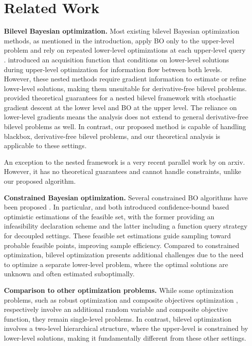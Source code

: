 \section{Related Work}
\textbf{Bilevel Bayesian optimization.} Most existing bilevel Bayesian optimization methods, as mentioned in the introduction, apply BO only to the upper-level problem and rely on repeated lower-level optimizations at each upper-level query \citep{kieffer2017bayesian, islam2018efficient, wang2021comparing}. \citet{dogan2023bilevel} introduced an acquisition function that conditions on lower-level solutions during upper-level optimization for information flow between both levels. However, these nested methods require gradient information to estimate or refine lower-level solutions, making them unsuitable for derivative-free bilevel problems. \citet{fuconvergence} provided theoretical guarantees for a nested bilevel framework with stochastic gradient descent at the lower level and BO at the upper level. The reliance on lower-level gradients means the analysis does not extend to general derivative-free bilevel problems as well. In contrast, our proposed method is capable of handling blackbox, derivative-free bilevel problems, and our theoretical analysis is applicable to these settings.

An exception to the nested framework is a very recent parallel work by \citet{ekmekcioglu2024bayesian} on arxiv. However, it has no theoretical guarantees and cannot handle constraints, unlike our proposed algorithm.

\textbf{Constrained Bayesian optimization.} 
Several constrained BO algorithms have been proposed \citep{gelbart2014bayesian, hernandez2016general}. In particular, \citet{xu2023constrained} and \citet{nguyen2023optimistic} both introduced confidence-bound based optimistic estimations of the feasible set, with the former providing an infeasibility declaration scheme and the latter including a function query strategy for decoupled settings. These feasible set estimations guide sampling toward probable feasible points, improving sample efficiency. Compared to constrained optimization, bilevel optimization presents additional challenges due to the need to optimize a separate lower-level problem, where the optimal solutions are unknown and often estimated suboptimally.

\textbf{Comparison to other optimization problems.} While some optimization problems, such as robust optimization \citep{bogunovic2018adversarially} and composite objectives optimization \citep{liregret}, respectively involve an additional random variable and composite objective function, they remain single-level problems. In contrast, bilevel optimization involves a two-level hierarchical structure, where the upper-level is constrained by lower-level solutions, making it fundamentally different from these other settings.